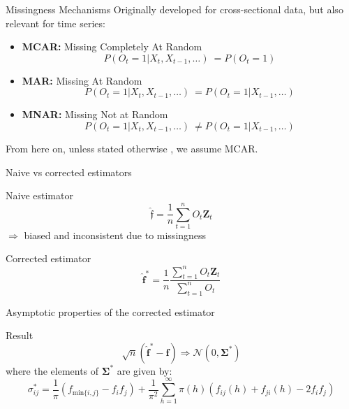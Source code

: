 \documentclass{beamer}
\begin{document}
\begin{frame}{Missingness Mechanisms}
    Originally developed for cross-sectional data, but also relevant for time series:
    \begin{itemize}  
        \item \textbf{MCAR:} Missing Completely At Random
        \[P(O_t = 1| X_t, X_{t-1}, \ldots)\ = P(O_t = 1)\]
        \item \textbf{MAR:} Missing At Random
        \[P(O_t = 1| X_t, X_{t-1}, \ldots)\ = P(O_t = 1| X_{t-1}, \ldots)\]
        \item \textbf{MNAR:} Missing Not at Random
        \[P(O_t = 1| X_t, X_{t-1}, \ldots)\ \neq P(O_t = 1| X_{t-1}, \ldots)\]
    \end{itemize}
    From here on, unless stated otherwise , we assume MCAR.
\end{frame}

\begin{frame}{Naive vs corrected estimators}
    \begin{block}{Naive estimator}
        \[\hat{\boldsymbol{\mathfrak{f}}} = \frac{1}{n} \sum_{t=1}^n O_t \boldsymbol{Z}_t\]
        $\Rightarrow$ biased and inconsistent due to missingness
    \end{block}
    \begin{block}{Corrected estimator}
        \[\hat{\boldsymbol{f}}^* = \frac{1}{n} \frac{\sum_{t=1}^n O_t \boldsymbol{Z}_t}{\sum_{t=1}^n O_t}\] 
    \end{block}
\end{frame}
\begin{frame}{Asymptotic properties of the corrected estimator}
    \begin{block}{Result}
        \[\sqrt{n}(\hat{\boldsymbol{f}}^* - \boldsymbol{f}) \Rightarrow \mathcal{N}(0, \boldsymbol{\Sigma}^*)\]
        where the elements of $\boldsymbol{\Sigma}^*$ are given by:
        \[\sigma^*_{ij} = \frac{1}{\pi} (f_{\mathrm{min}\{i,j\}}- f_i f_j) + \frac{1}{\pi^2} \sum_{h = 1}^{\infty} \pi(h)(f_{ij}(h) + f_{ji}(h) - 2f_if_j)\]
    \end{block}

\end{frame}
\end{document}
